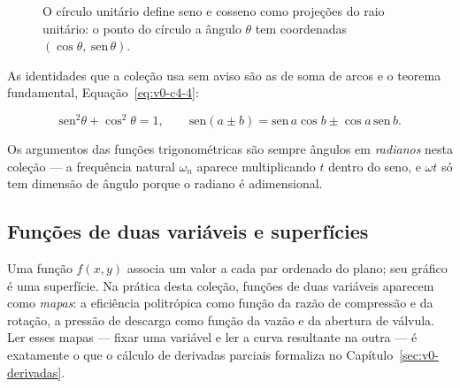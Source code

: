 \documentclass[12pt,a4paper]{article}
\numberwithin{equation}{section}
\numberwithin{table}{section}
\numberwithin{figure}{section}
\begin{document}
\begin{figure}[H]
\centering
{}
\caption[Círculo unitário: seno e cosseno como projeções.]{%
O círculo unitário define seno e cosseno como projeções do raio unitário:
o ponto do círculo a ângulo $\theta$ tem coordenadas
$(\cos\theta,\ \mathrm{sen}\,\theta)$.}
\label{fig:v0-c4-1}
\end{figure}

As identidades que a coleção usa sem aviso são as de soma de arcos e o
teorema fundamental, Equação~\eqref{eq:v0-c4-4}:

\begin{equation}\label{eq:v0-c4-4}
\mathrm{sen}^2\theta + \cos^2\theta = 1,
\qquad
\mathrm{sen}(a \pm b) = \mathrm{sen}\,a\cos b \pm \cos a\,\mathrm{sen}\,b.
\end{equation}

Os argumentos das funções trigonométricas são sempre ângulos em
\emph{radianos} nesta coleção --- a frequência natural $\omega_n$ aparece
multiplicando $t$ dentro do seno, e $\omega t$ só tem dimensão de ângulo
porque o radiano é adimensional.

\subsection{Funções de duas variáveis e superfícies}

Uma função $f(x,y)$ associa um valor a cada par ordenado do plano; seu
gráfico é uma superfície. Na prática desta coleção, funções de duas
variáveis aparecem como \emph{mapas}: a eficiência politrópica como função
da razão de compressão e da rotação, a pressão de descarga como função da
vazão e da abertura de válvula. Ler esses mapas --- fixar uma variável e
ler a curva resultante na outra --- é exatamente o que o cálculo de
derivadas parciais formaliza no Capítulo~\ref{sec:v0-derivadas}.
\end{document}
